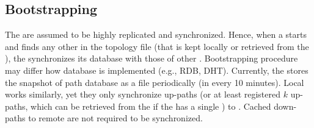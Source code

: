 \subsection{Bootstrapping}
The \ISDC \PS are assumed to be highly replicated and synchronized. Hence, when a \PS starts and finds any other \PSs in the topology file (that is kept locally or retrieved from the \CS), the \PS synchronizes its database with those of other \PSs. Bootstrapping procedure may differ how \PS database is implemented (e.g., RDB, DHT). Currently, the \PS stores the snapshot of path database as a file periodically (in every 10 minutes). Local \PSs works similarly, yet they only synchronize up-paths (or at least registered $k$ up-paths, which can be retrieved from the \BS if the \AD has a single \PS) to \ISDC. Cached down-paths to remote \ADs are not required to be synchronized. 



